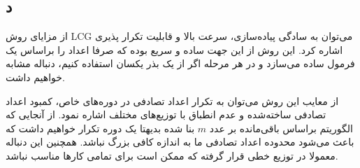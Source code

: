 \subsection*{د}
از مزایای روش
LCG
می‌توان به سادگی پیاده‌سازی، سرعت بالا و قابلیت تکرار پذیری اشاره کرد. این روش از این جهت ساده و سریع بوده که صرفا اعداد را براساس یک فرمول ساده می‌سازد و در هر مرحله اگر از یک بذر یکسان استفاده کنیم، دنباله مشابه خواهیم داشت.

از معایب این روش می‌توان به تکرار اعداد تصادفی در دوره‌های خاص، کمبود اعداد تصادفی ساخته‌شده و عدم انطباق با توزیع‌های مختلف اشاره نمود. از آنجایی که الگوریتم براساس باقی‌مانده بر عدد
$m$
بنا شده بدیهتا یک دوره تکرار خواهیم داشت که باعث می‌شود محدوده اعداد تصادفی ما به اندازه کافی بزرگ نباشد. همچنین این دنباله معمولا در توزیع خطی قرار گرفته که ممکن است برای تمامی کارها مناسب نباشد.